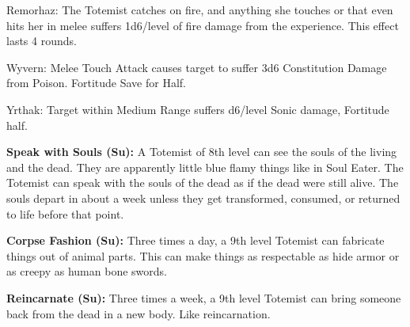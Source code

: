 \begin{itemize*}
\item Remorhaz: The Totemist catches on fire, and anything she touches or that even hits her in melee suffers 1d6/level of fire damage from the experience. This effect lasts 4 rounds. 
\item Wyvern: Melee Touch Attack causes target to suffer 3d6 Constitution Damage from Poison. Fortitude Save for Half. 
\item Yrthak: Target within Medium Range suffers d6/level Sonic damage, Fortitude half.
\end{itemize*}

\textbf{Speak with Souls (Su):} A Totemist of 8th level can see the souls of the living and the dead. They are apparently little blue flamy things like in Soul Eater. The Totemist can speak with the souls of the dead as if the dead were still alive. The souls depart in about a week unless they get transformed, consumed, or returned to life before that point. 

\textbf{Corpse Fashion (Su):} Three times a day, a 9th level Totemist can fabricate things out of animal parts. This can make things as respectable as hide armor or as creepy as human bone swords. 

\textbf{Reincarnate (Su):} Three times a week, a 9th level Totemist can bring someone back from the dead in a new body. Like reincarnation. 

